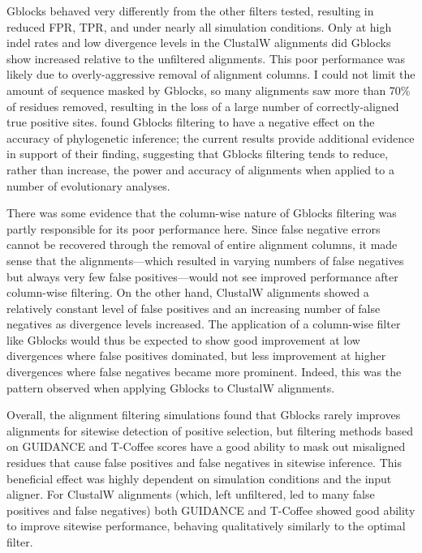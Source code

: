 Gblocks behaved very differently from the other filters tested,
resulting in reduced FPR, TPR, and \tpr under nearly all simulation
conditions. Only at high indel rates and low divergence levels in the
ClustalW alignments did Gblocks show increased \tpr relative to the
unfiltered alignments. This poor performance was likely due to
overly-aggressive removal of alignment columns. I could not limit the
amount of sequence masked by Gblocks, so many alignments saw more than
70\% of residues removed, resulting in the loss of a large number of
correctly-aligned true positive
sites. \citet{Dessimoz2010Phylogenetic} found Gblocks filtering to
have a negative effect on the accuracy of phylogenetic inference; the
current results provide additional evidence in support of their
finding, suggesting that Gblocks filtering tends to reduce, rather
than increase, the power and accuracy of alignments when applied to a
number of evolutionary analyses.

There was some evidence that the column-wise nature of Gblocks
filtering was partly responsible for its poor performance here. Since
false negative errors cannot be recovered through the removal of
entire alignment columns, it made sense that the \prankc
alignments---which resulted in varying numbers of false negatives but
always very few false positives---would not see improved performance
after column-wise filtering. On the other hand, ClustalW alignments
showed a relatively constant level of false positives and an
increasing number of false negatives as divergence levels
increased. The application of a column-wise filter like Gblocks would
thus be expected to show good improvement at low divergences where
false positives dominated, but less improvement at higher divergences
where false negatives became more prominent. Indeed, this was the
pattern observed when applying Gblocks to ClustalW alignments.

Overall, the alignment filtering simulations found that Gblocks rarely
improves alignments for sitewise detection of positive selection, but
filtering methods based on {GUIDANCE} and T-Coffee scores have a good
ability to mask out misaligned residues that cause false positives and
false negatives in sitewise inference. This beneficial effect was
highly dependent on simulation conditions and the input aligner. For
ClustalW alignments (which, left unfiltered, led to many false
positives and false negatives) both GUIDANCE and T-Coffee showed good
ability to improve sitewise performance, behaving qualitatively
similarly to the optimal filter.


